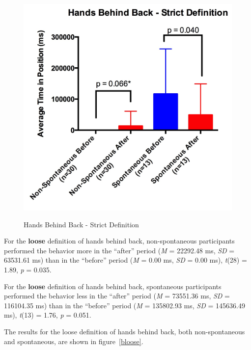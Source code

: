 \documentclass{acm_proc_article-sp}
\begin{document}
\begin{figure}[t!]
\centering
 \includegraphics[width=1.00\linewidth]{images/bstrict.jpg}\\
 \caption{Hands Behind Back - Strict Definition}
 \label{bstrict} %
\end{figure}

For the \textbf{loose} definition of hands behind back, non-spontaneous participants performed the behavior more in the ``after'' period (\textit{M} = 22292.48 ms, \textit{SD} = 63531.61 ms) than in the ``before'' period (\textit{M} = 0.00 ms, \textit{SD} = 0.00 ms), \textit{t}(28) = 1.89, \textit{p} = 0.035.

For the \textbf{loose} definition of hands behind back, spontaneous participants performed the behavior less in the ``after'' period (\textit{M} = 73551.36 ms, \textit{SD} = 116104.35 ms) than in the ``before'' period (\textit{M} = 135802.93 ms, \textit{SD} = 145636.49 ms), \textit{t}(13) = 1.76, \textit{p} = 0.051.

The results for the loose definition of hands behind back, both non-spontaneous and spontaneous, are shown in figure~\ref{bloose}.
\end{document}
